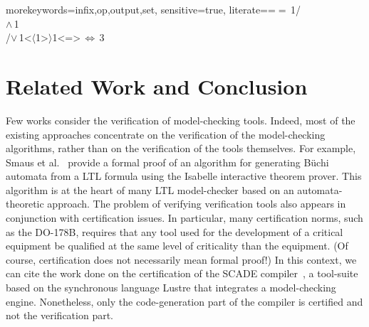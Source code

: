 \documentclass[a4paper]{scrartcl}
\newcommand{\interp}[2][{}]{(\kern-.5mm({#2})\kern-.5mm)_{#1}}
\begin{document}
{morekeywords={infix,op,output,set},
  sensitive=true,
  literate={=}{{\(=\,\)}}1{/\\}{{\(\wedge\,\)}}1{\\/}{{\(\vee\,\)}}1{<}{{\(\langle\)}}1{>}{{\(\rangle\)}}1{<=>}{{\(\,\Leftrightarrow\,\)}}3}






\section{Related Work and Conclusion}
\label{sec 6:related-work}


Few works consider the verification of model-checking tools. Indeed,
most of the existing approaches concentrate on the verification of the
model-checking algorithms, rather than on the verification of the
tools themselves. For example, Smaus et al.~\cite{smaus09} provide a
formal proof of an algorithm for generating Büchi automata from a LTL
formula using the Isabelle interactive theorem prover. This algorithm
is at the heart of many LTL model-checker based on an
automata-theoretic approach. The problem of verifying verification
tools also appears in conjunction with certification issues. In
particular, many certification norms, such as the DO-178B, requires
that any tool used for the development of a critical equipment be
qualified at the same level of criticality than the equipment. (Of
course, certification does not necessarily mean formal proof!) In this
context, we can cite the work done on the certification of the SCADE
compiler~\cite{scade}, a tool-suite based on the synchronous language
Lustre that integrates a model-checking engine. Nonetheless, only the
code-generation part of the compiler is certified and not the
verification part.
\end{document}
